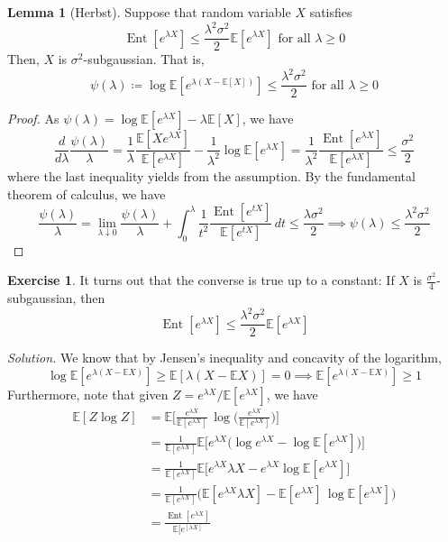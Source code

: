\documentclass{article}
\DeclareMathOperator{\Ent}{Ent}
\theoremstyle{definition}
\newtheorem{lemma}[theorem]{Lemma}
\newtheorem{exercise}{Exercise}[section]
\theoremstyle{remark}
\theoremstyle{definition}
\newenvironment{solution}{\noindent \textit{Solution.}}{}
\begin{document}
\begin{lemma}[Herbst]
Suppose that random variable $X$ satisfies
\[\Ent[e^{\lambda X}] \leq \frac{\lambda^2 \sigma^2}{2} \mathbb{E}[e^{\lambda X}]  \text{ for all } \lambda \geq 0\]
Then, $X$ is $\sigma^2$-subgaussian. That is, 
\[\psi(\lambda) \coloneqq \log\mathbb{E}[e^{\lambda (X - \mathbb{E}[X])}] \leq \frac{\lambda^2 \sigma^2}{2} \text{ for all } \lambda \geq 0\]
\end{lemma}
\begin{proof}
As $\psi(\lambda) = \log\mathbb{E}[ e^{\lambda X}] - \lambda \mathbb{E}[X]$, we have 
\[\frac{d}{d \lambda} \frac{\psi(\lambda)}{\lambda} = \frac{1}{\lambda} \frac{\mathbb{E}[X e^{\lambda X}]}{\mathbb{E}[e^{\lambda X}]} - \frac{1}{\lambda^2} \log \mathbb{E}[e^{\lambda X}] = \frac{1}{\lambda^2} \frac{\Ent [e^{\lambda X}]}{\mathbb{E}[e^{\lambda X}]} \leq \frac{\sigma^2}{2}\]
where the last inequality yields from the assumption. By the fundamental theorem of calculus, we have 
\[\frac{\psi (\lambda)}{\lambda} = \lim_{\lambda \downarrow 0} \frac{\psi(\lambda)}{\lambda} + \int_0^\lambda \frac{1}{t^2} \frac{\Ent[e^{t X}]}{\mathbb{E}[e^{t X}]} \,dt \leq \frac{\lambda \sigma^2}{2} \implies \psi(\lambda) \leq \frac{\lambda^2 \sigma^2}{2}\]
\end{proof}

\begin{exercise}
It turns out that the converse is true up to a constant: If $X$ is $\frac{\sigma^2}{4}$-subgaussian, then 
\[\Ent [e^{\lambda X}] \leq \frac{\lambda^2 \sigma^2}{2} \mathbb{E}[e^{\lambda X}]\]
\end{exercise}
\begin{solution}
We know that by Jensen's inequality and concavity of the logarithm, 
\[\log \mathbb{E}[e^{\lambda(X - \mathbb{E} X)}] \geq \mathbb{E}[\lambda (X - \mathbb{E} X)] = 0 \implies \mathbb{E}[e^{\lambda(X - \mathbb{E} X)}] \geq 1\]
Furthermore, note that given $Z = e^{\lambda X} / \mathbb{E}[e^{\lambda X}]$, we have 
\begin{align*}
    \mathbb{E}[Z \log{Z}] & = \mathbb{E} \bigg[ \frac{e^{\lambda X}}{\mathbb{E}[e^{\lambda X}]} \, \log \bigg( \frac{e^{\lambda X}}{\mathbb{E}[e^{\lambda X}]} \bigg) \bigg] \\
    & = \frac{1}{\mathbb{E}[e^{\lambda X}]} \mathbb{E}\big[ e^{\lambda X} \big( \log e^{\lambda X} - \log \mathbb{E}[e^{\lambda X}] \big) \big] \\
    & = \frac{1}{\mathbb{E}[e^{\lambda X}]} \mathbb{E} \big[ e^{\lambda X} \lambda X - e^{\lambda X} \log \mathbb{E}[e^{\lambda X}] \big] \\
    & = \frac{1}{\mathbb{E}[e^{\lambda X}]} \Big( \mathbb{E} [ e^{\lambda X} \lambda X ] - \mathbb{E}[ e^{\lambda X}] \, \log \mathbb{E}[e^{\lambda X}] \Big) \\
    & = \frac{\Ent [e^{\lambda X}]}{\mathbb{E}[e^[{\lambda X}]} 
\end{align*}

\end{solution}
\end{document}
